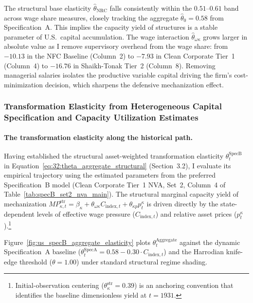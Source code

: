 The structural base elasticity $\hat{\theta}_{\text{NRC}}$ falls consistently within the $0.51$--$0.61$ band across wage share measures, closely tracking the aggregate $\hat{\theta}_0 = 0.58$ from Specification~A. This implies the capacity yield of structures is a stable parameter of U.S.\ capital accumulation. The wage interaction $\hat{\theta}_{\omega\kappa}$ grows larger in absolute value as I remove supervisory overhead from the wage share: from $-10.13$ in the NFC Baseline (Column~2) to $-7.93$ in Clean Corporate Tier~1 (Column~4) to $-16.76$ in Shaikh-Tonak Tier~2 (Column~8). Removing managerial salaries isolates the productive variable capital driving the firm's cost-minimization decision, which sharpens the defensive mechanization effect.




\subsubsection{Transformation Elasticity from Heterogeneous Capital Specification and Capacity Utilization Estimates}

\paragraph{The transformation elasticity along the historical path.}
Having established the structural asset-weighted transformation elasticity $\theta^{\text{SpecB}}_t$ in Equation~\eqref{eq:32:theta_aggregate_structural} (Section~3.2), I evaluate its empirical trajectory using the estimated parameters from the preferred Specification~B model (Clean Corporate Tier~1 NVA, Set~2, Column~4 of Table~\ref{tab:specB_set2_nva_main}). The structural marginal capacity yield of mechanization $MP_{\kappa,t}^{\text{str}} = \beta_\kappa + \theta_{\omega\kappa} C_{\text{index},t} + \theta_{\kappa p} p^\kappa_t$ is driven directly by the state-dependent levels of effective wage pressure ($C_{\text{index},t}$) and relative asset prices ($p^\kappa_t$).\footnote{Initial-observation
	centering ($\theta_\kappa^{\text{str}} = 0.39$) is an anchoring convention
	that identifies the baseline dimensionless yield at $t = 1931$.}

Figure~\ref{fig:us_specB_aggregate_elasticity} plots $\theta^{\text{Aggregate}}_t$ against the dynamic Specification~A baseline ($\theta^{\text{SpecA}}_t = 0.58 - 0.30 \cdot C_{\text{index},t}$) and the Harrodian knife-edge threshold ($\theta = 1.00$) under standard structural regime shading.

